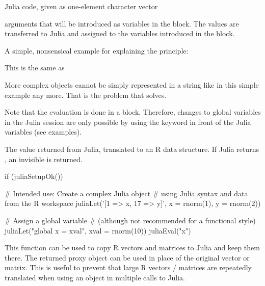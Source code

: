 %
\begin{Arguments}
\begin{ldescription}
\item[\code{expr}] Julia code, given as one-element character vector

\item[\code{...}] arguments that will be introduced as variables in the
 block. The values are transferred to Julia and
assigned to the variables introduced in the  block.
\end{ldescription}
\end{Arguments}
%
\begin{Details}\relax
A simple, nonsensical example for explaining the principle:


This is the same as


More complex objects cannot be simply represented in a string like in
this simple example any more.
That is the problem that  solves.

Note that the evaluation is done in a  block. Therefore,
changes to global variables in the Julia session are only possible by
using the keyword  in front of the Julia variables
(see examples).
\end{Details}
%
\begin{Value}
The value returned from Julia, translated to an R data structure.
If Julia returns , an invisible  is returned.
\end{Value}
%
\begin{Examples}
\begin{ExampleCode}
if (juliaSetupOk()) {

   # Intended use: Create a complex Julia object
   # using Julia syntax and data from the R workspace
   juliaLet('[1 => x, 17 => y]', x = rnorm(1), y = rnorm(2))

   # Assign a global variable
   # (although not recommended for a functional style)
   juliaLet("global x = xval", xval = rnorm(10))
   juliaEval("x")

}


\end{ExampleCode}
\end{Examples}
%
\begin{Description}\relax
This function can be used to copy R vectors and matrices to Julia and keep
them there.
The returned proxy object can be used in place of the original vector or
matrix.
This is useful to prevent that large R vectors / matrices
are repeatedly translated when using an object in multiple calls to Julia.
\end{Description}
